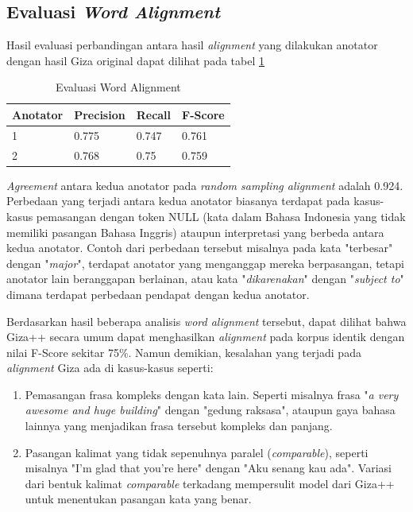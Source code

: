 \subsection{Evaluasi \textit{Word Alignment}}

Hasil evaluasi perbandingan antara hasil \textit{alignment} yang dilakukan anotator dengan hasil Giza original dapat dilihat pada tabel \ref{table:word-alignment-evaluation}

\begin{table}
	\centering
	\caption{Evaluasi Word Alignment}
	\label{table:word-alignment-evaluation}
	\begin{tabular}{|p{2cm}|p{2cm}|p{2cm}|p{2cm}|}
		\hline
		\textbf{Anotator} & \textbf{Precision} & \textbf{Recall} & \textbf{F-Score}
		\\ \hline
		1 & 0.775 & 0.747 & 0.761
		\\ \hline
		2 & 0.768 & 0.75 & 0.759
		\\ \hline
	\end{tabular} 
\end{table}

\textit{Agreement} antara kedua anotator pada \textit{random sampling alignment} adalah 0.924. Perbedaan yang terjadi antara kedua anotator biasanya terdapat pada kasus-kasus pemasangan dengan token NULL (kata dalam Bahasa Indonesia yang tidak memiliki pasangan Bahasa Inggris) ataupun interpretasi yang berbeda antara kedua anotator. Contoh dari perbedaan tersebut misalnya pada kata "terbesar" dengan "\textit{major}", terdapat anotator yang menganggap mereka berpasangan, tetapi anotator lain beranggapan berlainan, atau kata "\textit{dikarenakan}" dengan "\textit{subject to}" dimana terdapat perbedaan pendapat dengan kedua anotator.

Berdasarkan hasil beberapa analisis \textit{word alignment} tersebut, dapat dilihat bahwa Giza++ secara umum dapat menghasilkan \textit{alignment} pada korpus identik dengan nilai F-Score sekitar 75\%. Namun demikian, kesalahan yang terjadi pada \textit{alignment} Giza ada di kasus-kasus seperti:

\begin{enumerate}
	\item Pemasangan frasa kompleks dengan kata lain. Seperti misalnya frasa "\textit{a very awesome and huge building}" dengan "gedung raksasa", ataupun gaya bahasa lainnya yang menjadikan frasa tersebut kompleks dan panjang.
	\item Pasangan kalimat yang tidak sepenuhnya paralel (\textit{comparable}), seperti misalnya "I'm glad that you're here" dengan "Aku senang kau ada". Variasi dari bentuk kalimat \textit{comparable} terkadang mempersulit model dari Giza++ untuk menentukan pasangan kata yang benar.
\end{enumerate}

